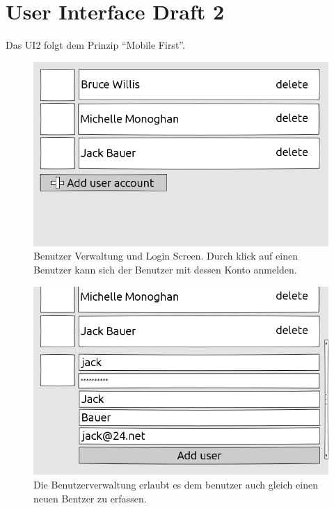 \section{User Interface Draft 2}
	Das UI2 folgt dem Prinzip "`Mobile First"'.
	\begin{figure}[H]
		\centering
		\includegraphics[height=0.35\textheight]{../ui/img/uiDraft2/UserView-selectUser.png}
		\caption[Accound screen draft2]{Benutzer Verwaltung und Login Screen. Durch klick auf einen Benutzer kann sich der Benutzer mit dessen Konto anmelden.}
		\label{login screen}
	\end{figure}
	\begin{figure}[H]
		\centering
		\includegraphics[height=0.35\textheight]{../ui/img/uiDraft2/UserView-addUser.png}
		\caption[Account management Screen draft2]{Die Benutzerverwaltung erlaubt es dem benutzer auch gleich einen neuen Bentzer zu erfassen.}
		\label{user management screen}
	\end{figure}
